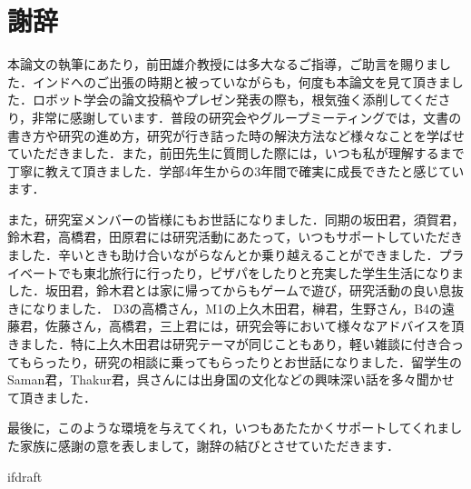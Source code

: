 \documentclass[a4paper,twoside,12pt,papersize, dvipdfmx]{iirthesis}
\begin{document}
\fi

\chapter{謝辞}\label{chapter:acknowledgements}
本論文の執筆にあたり，前田雄介教授には多大なるご指導，ご助言を賜りました．インドへのご出張の時期と被っていながらも，何度も本論文を見て頂きました．ロボット学会の論文投稿やプレゼン発表の際も，根気強く添削してくださり，非常に感謝しています．普段の研究会やグループミーティングでは，文書の書き方や研究の進め方，研究が行き詰った時の解決方法など様々なことを学ばせていただきました．また，前田先生に質問した際には，いつも私が理解するまで丁寧に教えて頂きました．学部4年生からの3年間で確実に成長できたと感じています．\par
また，研究室メンバーの皆様にもお世話になりました．同期の坂田君，須賀君，鈴木君，高橋君，田原君には研究活動にあたって，いつもサポートしていただきました．辛いときも助け合いながらなんとか乗り越えることができました．プライベートでも東北旅行に行ったり，ピザパをしたりと充実した学生生活になりました．坂田君，鈴木君とは家に帰ってからもゲームで遊び，研究活動の良い息抜きになりました．
D3の高橋さん，M1の上久木田君，榊君，生野さん，B4の遠藤君，佐藤さん，高橋君，三上君には，研究会等において様々なアドバイスを頂きました．特に上久木田君は研究テーマが同じこともあり，軽い雑談に付き合ってもらったり，研究の相談に乗ってもらったりとお世話になりました．留学生のSaman君，Thakur君，呉さんには出身国の文化などの興味深い話を多々聞かせて頂きました．\par
最後に，このような環境を与えてくれ，いつもあたたかくサポートしてくれました家族に感謝の意を表しまして，謝辞の結びとさせていただきます．


\expandafter\ifx\csname ifdraft\endcsname\relax
  
\end{document}
